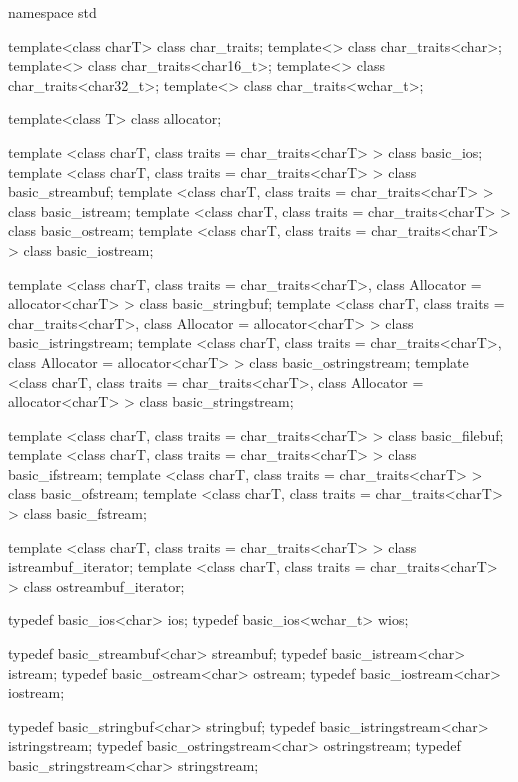 \begin{codeblock}
namespace std {
  template<class charT> class char_traits;
  template<> class char_traits<char>;
  template<> class char_traits<char16_t>;
  template<> class char_traits<char32_t>;
  template<> class char_traits<wchar_t>;

  template<class T> class allocator;

  template <class charT, class traits = char_traits<charT> >
    class basic_ios;
  template <class charT, class traits = char_traits<charT> >
    class basic_streambuf;
  template <class charT, class traits = char_traits<charT> >
    class basic_istream;
  template <class charT, class traits = char_traits<charT> >
    class basic_ostream;
  template <class charT, class traits = char_traits<charT> >
    class basic_iostream;

  template <class charT, class traits = char_traits<charT>,
      class Allocator = allocator<charT> >
    class basic_stringbuf;
  template <class charT, class traits = char_traits<charT>,
      class Allocator = allocator<charT> >
    class basic_istringstream;
  template <class charT, class traits = char_traits<charT>,
      class Allocator = allocator<charT> >
    class basic_ostringstream;
  template <class charT, class traits = char_traits<charT>,
      class Allocator = allocator<charT> >
    class basic_stringstream;

  template <class charT, class traits = char_traits<charT> >
    class basic_filebuf;
  template <class charT, class traits = char_traits<charT> >
    class basic_ifstream;
  template <class charT, class traits = char_traits<charT> >
    class basic_ofstream;
  template <class charT, class traits = char_traits<charT> >
    class basic_fstream;

  template <class charT, class traits = char_traits<charT> >
    class istreambuf_iterator;
  template <class charT, class traits = char_traits<charT> >
    class ostreambuf_iterator;

  typedef basic_ios<char>       ios;
  typedef basic_ios<wchar_t>    wios;

  typedef basic_streambuf<char> streambuf;
  typedef basic_istream<char>   istream;
  typedef basic_ostream<char>   ostream;
  typedef basic_iostream<char>  iostream;

  typedef basic_stringbuf<char>     stringbuf;
  typedef basic_istringstream<char> istringstream;
  typedef basic_ostringstream<char> ostringstream;
  typedef basic_stringstream<char>  stringstream;

}
\end{codeblock}
